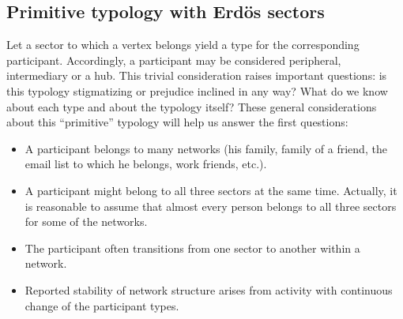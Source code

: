 \documentclass[%
 aip,
 jmp,%
 amsmath,amssymb,
 reprint,%
]{revtex4-1}
\begin{document}


    \subsection{Primitive typology with Erd\"os sectors}\label{sec:pty}

Let a sector to which a vertex belongs yield a type for the corresponding participant. Accordingly, a participant may be considered peripheral, intermediary or a hub. This trivial consideration raises important questions: is this typology stigmatizing or prejudice inclined in any way? What do we know about each type and about the typology itself?
These general considerations about this ``primitive'' typology will help us answer the first questions:
\begin{itemize}
	\item A participant belongs to many networks (his family, family of a friend, the email list to which he belongs, work friends, etc.).
	\item A participant might belong to all three sectors at the same time. Actually, it is reasonable to assume that almost every person belongs to all three sectors for some of the networks.
	\item The participant often transitions from one sector to another within a network.
	\item Reported stability of network structure arises from activity with continuous change of the participant types.
\end{itemize}
\end{document}
